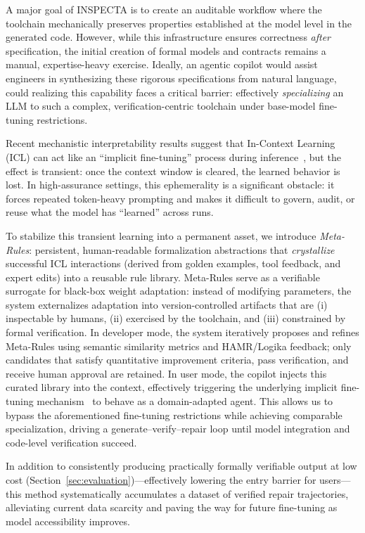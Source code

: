 \documentclass[conference]{IEEEtran}
\begin{document}
A major goal of INSPECTA is to create an auditable workflow where the toolchain mechanically preserves properties established at the model level in the generated code. However, while this infrastructure ensures correctness \emph{after} specification, the initial creation of formal models and contracts remains a manual, expertise-heavy exercise. Ideally, an agentic copilot would assist engineers in synthesizing these rigorous specifications from natural language, could realizing this capability faces a critical barrier: effectively \emph{specializing} an LLM to such a complex, verification-centric toolchain under base-model fine-tuning restrictions.

Recent mechanistic interpretability results suggest that In-Context Learning (ICL) can act like an ``implicit fine-tuning'' process during inference~\cite{vonoswald2023transformers}, but the effect is transient: once the context window is cleared, the learned behavior is lost. In high-assurance settings, this ephemerality is a significant obstacle: it forces repeated token-heavy prompting and makes it difficult to govern, audit, or reuse what the model has ``learned'' across runs.

To stabilize this transient learning into a permanent asset, we introduce \textit{Meta-Rules}: persistent, human-readable formalization abstractions that \emph{crystallize} successful ICL interactions (derived from golden examples, tool feedback, and expert edits) into a reusable rule library. Meta-Rules serve as a verifiable surrogate for black-box weight adaptation: instead of modifying parameters, the system externalizes adaptation into version-controlled artifacts that are (i) inspectable by humans, (ii) exercised by the toolchain, and (iii) constrained by formal verification.
%
In developer mode, the system iteratively proposes and refines Meta-Rules using semantic similarity metrics and HAMR/Logika feedback; only candidates that satisfy quantitative improvement criteria, pass verification, and receive human approval are retained. In user mode, the copilot injects this curated library into the context, effectively triggering the underlying implicit fine-tuning mechanism~\cite{vonoswald2023transformers} to behave as a domain-adapted agent. This allows us to bypass the aforementioned fine-tuning restrictions while achieving comparable specialization, driving a generate--verify--repair loop until model integration and code-level verification succeed.

In addition to consistently producing practically formally verifiable output at low cost (Section~\ref{sec:evaluation})---effectively lowering the entry barrier for users---this method systematically accumulates a dataset of verified repair trajectories, alleviating current data scarcity and paving the way for future fine-tuning as model accessibility improves.
\end{document}
